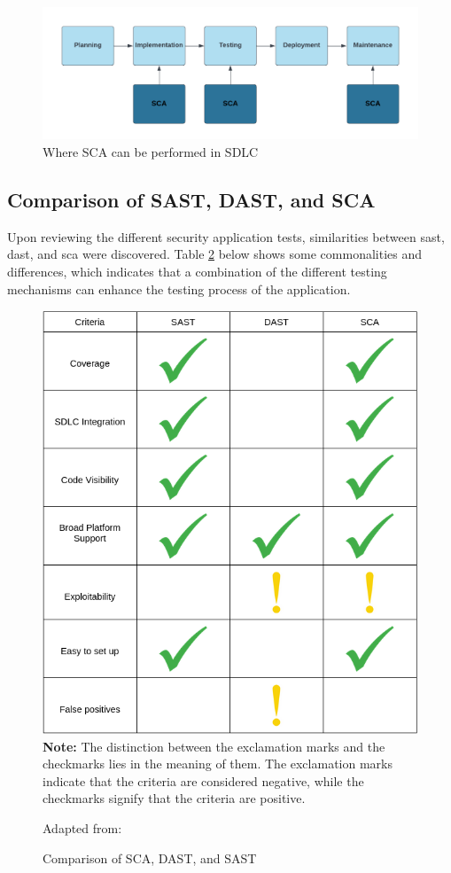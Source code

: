 \vspace{2mm}
\begin{figure}[H]
    \centering
    \includegraphics[width=0.8\columnwidth]{Images/sca.png}
    \caption{Where SCA can be performed in SDLC} 
    \label{fig: Where SCA can be performed in SDLC}
\end{figure}

\newpage
\subsection{Comparison of SAST, DAST, and SCA}
Upon reviewing the different security application tests, similarities between \acrshort{sast}, \acrshort{dast}, and \acrshort{sca} were discovered. Table \ref{fig: Comparison of SCA, DAST, and SASt} below shows some commonalities and differences, which indicates that a combination of the different testing mechanisms can enhance the testing process of the application. 

\vspace{2mm}
\begin{figure}[H]
    \centering
    \includegraphics[width=0.8\columnwidth]{Images/application-security-testing.png}\\
    \textbf{Note:} The distinction between the exclamation marks and the checkmarks lies in the meaning of them. The exclamation marks indicate that the criteria are considered negative, while the checkmarks signify that the criteria are positive.
    \caption{Comparison of SCA, DAST, and SAST}Adapted from: \cite{Comparison}
    \label{fig: Comparison of SCA, DAST, and SASt}
\end{figure}

